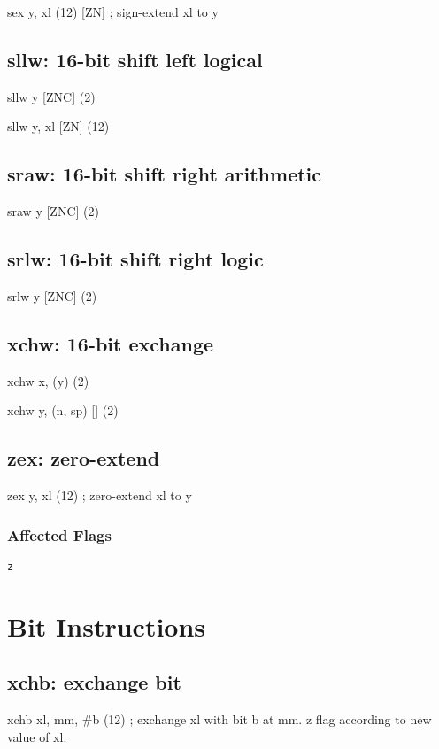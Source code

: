 \documentclass{book}
\begin{document}
sex y, xl (12) [ZN]    ; sign-extend xl to y

\subsection{sllw: 16-bit shift left logical}

sllw y [ZNC] (2)

sllw y, xl [ZN] (12)


\subsection{sraw: 16-bit shift right arithmetic}

sraw y [ZNC] (2)


\subsection{srlw: 16-bit shift right logic}

srlw y [ZNC] (2)


\subsection{xchw: 16-bit exchange}

xchw x, (y) (2)

xchw y, (n, sp) [] (2)


\subsection{zex: zero-extend}

zex y, xl (12) ; zero-extend xl to y

\subsubsection*{Affected Flags}

\texttt{z}


\section{Bit Instructions}

\subsection{xchb: exchange bit}

xchb xl, mm, \#b (12) ; exchange xl with bit b at mm. z flag according to new value of xl.
\end{document}
